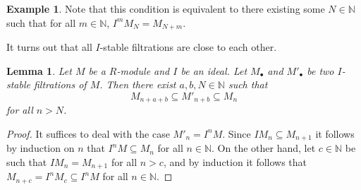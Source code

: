 \documentclass{amsart}[12pt]
\newcommand{\N}{\mathbb{N}}
\numberwithin{equation}{section}
\theoremstyle{plain} %
\newtheorem{lemma}[equation]{Lemma}
\newtheorem{prop}[equation]{Proposition}
\theoremstyle{definition}
\newtheorem{ex}[equation]{Example}
\theoremstyle{remark}
\newcommand{\gr}{\mathrm{gr}}
\begin{document}
\begin{ex}
Note that this condition is equivalent to there existing some $N\in \N$ such that for all $m\in \N$, $I^m M_N = M_{N+m}$.

It turns out that all $I$-stable filtrations are close to each other.

\begin{lemma} Let $M$ be a $R$-module and $I$ be an ideal. Let $M_\bullet$ and $M'_\bullet$ be two $I$-stable filtrations of $M$. Then there exist $a,b,N\in \N$ such that
\[ M_{n+a+b} \subseteq M'_{n+b} \subseteq M_{n} \] 
for all $n>N$.
\end{lemma}
\begin{proof} It suffices to deal with the case $M'_n = I^n M$. Since $I M_n \subseteq M_{n+1}$ it follows by induction on $n$ that $I^n M \subseteq M_n$ for all $n\in \N$. On the other hand, let $c\in \N$ be such that $I M_n = M_{n+1}$ for all $n> c$, and by induction it follows that $M_{n+c} = I^n M_c \subseteq I^n M$ for all $n\in \N$.
\end{proof}

\begin{comment}


\begin{prop} Let $R$ be a Noetherian ring. Let $M$ be a finitely generated $R$-module. Let $M_{\bullet} = \{M_i\}$ be a filtration of $M$ consistent with the $I$-adic filtration. Consider the conditions
\begin{enumerate}
\item $M_{\bullet}$ is $I$-stable;
\item $\mathcal{R}(M_{\bullet})$ is a finitely generated $\mathcal{R}(I)$-module;
\item $\gr(M_{\bullet})$ is a finitely generated $\gr_I(R)$-module.
\end{enumerate}
Then we have the implications (1)$\Leftrightarrow$(2)$\Rightarrow$(3).
\end{prop}
\begin{proof}
First we show (1) and (2) are equivalent. Given $M_\bullet$, define for each $n$ the $\mathcal{R}(I)$-module
\[ N_n := M_0 \oplus M_1 t \oplus \cdots \oplus M_n t^n \oplus  I M_{n} t^{n+1} \oplus  I^2 M_{n} t^{n+2} \oplus \cdots.\]
Note that $N_n$ is generated as an $\mathcal{R}(I)$-module by $M_0 \oplus M_1 t \oplus \cdots \oplus M_n t^n$, and since each $M_i$ is a submodule of $M$, each is a finitely generated $R$-module, so $N_n$ is a finitely generated $\mathcal{R}(I)$-module.

Thus there is an ascending chain of $\mathcal{R}(I)$-submodules
\[ N_0 \subseteq N_1 \subseteq N_2 \subseteq \cdots \]
of $\mathcal{R}(M_{\bullet})$ whose union is $\mathcal{R}(M_{\bullet})$. Note from the definition that $M_\bullet$ is $I$-stable if and only if $\mathcal{R}(M_{\bullet}) = N_n$ for some $n$, which is equivalent to the chain stabilizing. If $\mathcal{R}(M_{\bullet})$ is a finitely generated $\mathcal{R}(I)$-module, then it is a Noetherian module, so the chain stabilizes; conversely, if the chain stabilizes, then $\mathcal{R}(M_{\bullet}) = N_n$ is finitely generated. This concludes the equivalence of (1) and (2).


\end{comment}
\end{ex}
\end{document}
